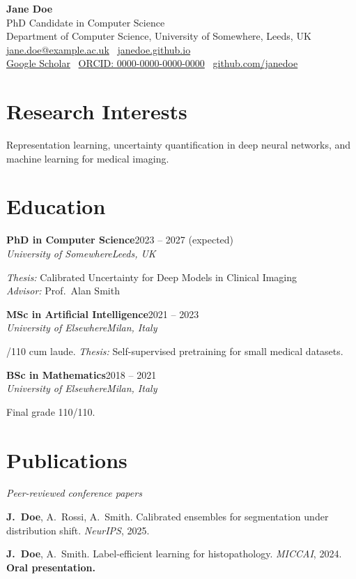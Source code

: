 \documentclass[11pt,a4paper]{article}
\newcommand{\cventry}[4]{%
  \textbf{#1}\hfill #2\\
  \textit{#3}\hfill\textit{#4}\par\smallskip}
\newcommand{\me}{\textbf{J.~Doe}}
\begin{document}
\begin{center}
  {\Huge\bfseries Jane Doe}\\[4pt]
  {\large PhD Candidate in Computer Science}\\[2pt]
  Department of Computer Science, University of Somewhere, Leeds, UK\\[4pt]
  \href{mailto:jane.doe@example.ac.uk}{jane.doe@example.ac.uk} \textbullet\
  \href{https://janedoe.github.io}{janedoe.github.io}\\
  \href{https://scholar.google.com}{Google Scholar} \textbullet\
  \href{https://orcid.org/0000-0000-0000-0000}{ORCID: 0000-0000-0000-0000} \textbullet\
  \href{https://github.com/janedoe}{github.com/janedoe}
\end{center}

\section{Research Interests}
Representation learning, uncertainty quantification in deep neural networks,
and machine learning for medical imaging.

\section{Education}
\cventry{PhD in Computer Science}{2023 -- 2027 (expected)}{University of Somewhere}{Leeds, UK}
\textit{Thesis:} Calibrated Uncertainty for Deep Models in Clinical Imaging\\
\textit{Advisor:} Prof.~Alan Smith

\medskip
\cventry{MSc in Artificial Intelligence}{2021 -- 2023}{University of Elsewhere}{Milan, Italy}
110/110 cum laude. \textit{Thesis:} Self-supervised pretraining for small medical datasets.

\medskip
\cventry{BSc in Mathematics}{2018 -- 2021}{University of Elsewhere}{Milan, Italy}
Final grade 110/110.

\section{Publications}
\textit{Peer-reviewed conference papers}
\begin{enumerate}[label={[C\arabic*]}, leftmargin=*, noitemsep, topsep=2pt]
  \item \me, A.~Rossi, A.~Smith. Calibrated ensembles for segmentation under
        distribution shift. \textit{NeurIPS}, 2025.
  \item \me, A.~Smith. Label-efficient learning for histopathology.
        \textit{MICCAI}, 2024. \textbf{Oral presentation.}
\end{enumerate}
\end{document}

